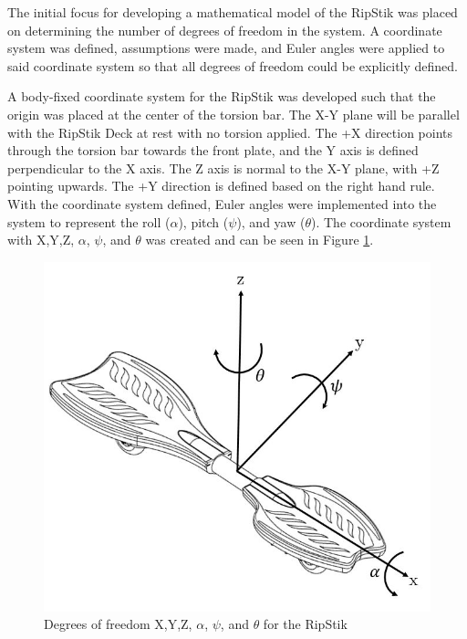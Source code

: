 The initial focus for developing a mathematical model of the RipStik was placed on determining the number of degrees of freedom in the system. 
A coordinate system was defined, assumptions were made, and Euler angles were applied to said coordinate system so that all degrees of freedom could be explicitly defined.
\par
A body-fixed coordinate system for the RipStik was developed such that the origin was placed at the center of the torsion bar. The X-Y plane will be parallel with the RipStik Deck at rest with no torsion applied.
The +X direction points through the torsion bar towards the front plate, and the Y axis is defined perpendicular to the X axis. The Z axis is normal to the X-Y plane, with +Z pointing upwards. The +Y direction is defined based on the right hand rule.
With the coordinate system defined, Euler angles were implemented into the system to represent the roll ($\alpha$), pitch ($\psi$), and yaw ($\theta$).
The coordinate system with X,Y,Z, $\alpha$, $\psi$, and $\theta$ was created and can be seen in Figure \ref{fig:RipStikCoord}.

\begin{figure}[!htb]
	\centering
	\includegraphics[width=\linewidth]{DOFpart1.jpg}
	\caption{Degrees of freedom X,Y,Z, $\alpha$, $\psi$, and $\theta$ for the RipStik}\label{fig:RipStikCoord}
	\endminipage
\end{figure}

